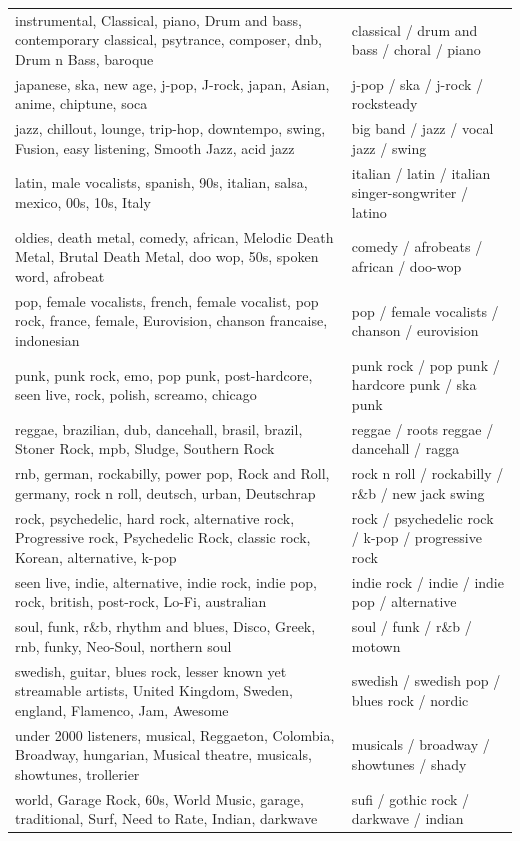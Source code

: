 \documentclass[
  man]{apa7}
\begin{document}
\begin{table}
\begin{tabular*}{\linewidth}{@{\extracolsep{\fill}}>{\centering\arraybackslash}p{\dimexpr 262.50pt -2\tabcolsep-1.5\arrayrulewidth}>{\raggedright\arraybackslash}p{\dimexpr 225.00pt -2\tabcolsep-1.5\arrayrulewidth}}
instrumental, Classical, piano, Drum and bass, contemporary classical, psytrance, composer, dnb, Drum n Bass, baroque & classical / drum and bass / choral / piano \\ 
japanese, ska, new age, j-pop, J-rock, japan, Asian, anime, chiptune, soca & j-pop / ska / j-rock / rocksteady \\ 
jazz, chillout, lounge, trip-hop, downtempo, swing, Fusion, easy listening, Smooth Jazz, acid jazz & big band / jazz / vocal jazz / swing \\ 
latin, male vocalists, spanish, 90s, italian, salsa, mexico, 00s, 10s, Italy & italian / latin / italian singer-songwriter / latino \\ 
oldies, death metal, comedy, african, Melodic Death Metal, Brutal Death Metal, doo wop, 50s, spoken word, afrobeat & comedy / afrobeats / african / doo-wop \\ 
pop, female vocalists, french, female vocalist, pop rock, france, female, Eurovision, chanson francaise, indonesian & pop / female vocalists / chanson / eurovision \\ 
punk, punk rock, emo, pop punk, post-hardcore, seen live, rock, polish, screamo, chicago & punk rock / pop punk / hardcore punk / ska punk \\ 
reggae, brazilian, dub, dancehall, brasil, brazil, Stoner Rock, mpb, Sludge, Southern Rock & reggae / roots reggae / dancehall / ragga \\ 
rnb, german, rockabilly, power pop, Rock and Roll, germany, rock n roll, deutsch, urban, Deutschrap & rock n roll / rockabilly / r\&b / new jack swing \\ 
rock, psychedelic, hard rock, alternative rock, Progressive rock, Psychedelic Rock, classic rock, Korean, alternative, k-pop & rock / psychedelic rock / k-pop / progressive rock \\ 
seen live, indie, alternative, indie rock, indie pop, rock, british, post-rock, Lo-Fi, australian & indie rock / indie / indie pop / alternative \\ 
soul, funk, r\&b, rhythm and blues, Disco, Greek, rnb, funky, Neo-Soul, northern soul & soul / funk / r\&b / motown \\ 
swedish, guitar, blues rock, lesser known yet streamable artists, United Kingdom, Sweden, england, Flamenco, Jam, Awesome & swedish / swedish pop / blues rock / nordic \\ 
under 2000 listeners, musical, Reggaeton, Colombia, Broadway, hungarian, Musical theatre, musicals, showtunes, trollerier & musicals / broadway / showtunes / shady \\ 
world, Garage Rock, 60s, World Music, garage, traditional, Surf, Need to Rate, Indian, darkwave & sufi / gothic rock / darkwave / indian \\ 
\bottomrule
\end{tabular*}
\end{table}
\end{document}

